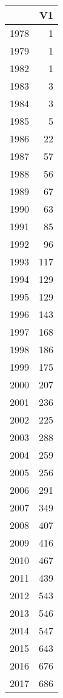 \begin{table}[ht]
\centering
\begin{tabular}{rr}
  \hline
 & V1 \\ 
  \hline
1978 &   1 \\ 
  1979 &   1 \\ 
  1982 &   1 \\ 
  1983 &   3 \\ 
  1984 &   3 \\ 
  1985 &   5 \\ 
  1986 &  22 \\ 
  1987 &  57 \\ 
  1988 &  56 \\ 
  1989 &  67 \\ 
  1990 &  63 \\ 
  1991 &  85 \\ 
  1992 &  96 \\ 
  1993 & 117 \\ 
  1994 & 129 \\ 
  1995 & 129 \\ 
  1996 & 143 \\ 
  1997 & 168 \\ 
  1998 & 186 \\ 
  1999 & 175 \\ 
  2000 & 207 \\ 
  2001 & 236 \\ 
  2002 & 225 \\ 
  2003 & 288 \\ 
  2004 & 259 \\ 
  2005 & 256 \\ 
  2006 & 291 \\ 
  2007 & 349 \\ 
  2008 & 407 \\ 
  2009 & 416 \\ 
  2010 & 467 \\ 
  2011 & 439 \\ 
  2012 & 543 \\ 
  2013 & 546 \\ 
  2014 & 547 \\ 
  2015 & 643 \\ 
  2016 & 676 \\ 
  2017 & 686 \\ 
   \hline
\end{tabular}
\end{table}
